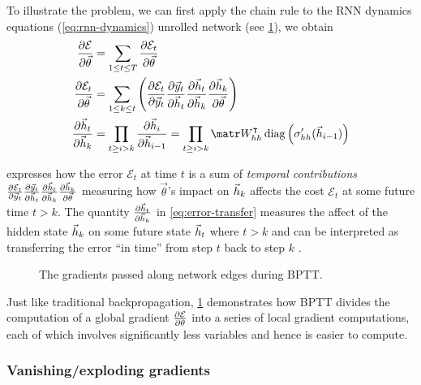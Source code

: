 To illustrate the problem, we can first apply the chain rule to the RNN
dynamics equations (\vref{eq:rnn-dynamics}) unrolled network (see
\cref{fig:rnn-bptt}), we obtain
\begin{align}
  \frac{\pd \mathcal{E}}{\pd \vec{\theta}} &= \sum_{1 \leq t \leq T} \frac{\pd \mathcal{E}_t}{\pd \vec{\theta}} \label{eq:err-total}\\
    \frac{\pd \mathcal{E}_t}{\pd \vec{\theta}} &= \sum_{1 \leq k \leq t} \left(
        \frac{\pd \mathcal{E}_t}{\pd \y_t}
        \frac{\pd \y_t}{\pd \h_t}
        \frac{\pd \h_t}{\pd \h_k}
        \frac{\pd \h_k}{\pd \vec{\theta}}
    \right) \label{eq:error-t}\\
    \frac{\pd \h_t}{\pd \h_k} &=
    \prod_{t \geq i > k} \frac{\pd \h_i}{\pd \h_{i-1}}
    = \prod_{t \geq i > k} \W_{hh}^\tp \diag \left( \sigma_{hh}'( \h_{i-1} ) \right)
    \label{eq:error-transfer}
\end{align}

 expresses how the error $\mathcal{E}_t$ at time $t$ is a sum
of \emph{temporal contributions} $
\frac{\partial \mathcal{E}_t}{\partial \vec{y}_t}
\frac{\partial \vec{y}_t}{\partial \vec{h}_t}
\frac{\partial \vec{h}_t}{\partial \vec{h}_k}
\frac{\partial \vec{h}_k}{\partial \vec{\theta}}$
measuring how $\vec{\theta}$'s impact on $\vec{h}_k$ affects the cost
$\mathcal{E}_t$ at some future time $t > k$. The quantity
$\frac{\partial \vec{h}_t}{\partial \vec{h}_k}$ in \cref{eq:error-transfer} measures the affect of
the hidden state $\vec{h}_k$ on some future state $\vec{h}_t$ where $t > k$ and can be
interpreted as transferring the error ``in time'' from step $t$ back to step
$k$ \citep{Pascanu2012}.

\begin{figure}[tb]
    \centering
    
    \caption{The gradients passed along network edges during BPTT.}
    \label{fig:rnn-bptt}
\end{figure}

Just like traditional backpropagation, \cref{fig:rnn-bptt} demonstrates how
BPTT divides the computation of a global gradient $\frac{\partial \mathcal{E}}{\partial
\theta}$ into a series of local gradient computations, each of which involves
significantly less variables and hence is easier to compute.

\subsubsection{Vanishing/exploding gradients}

